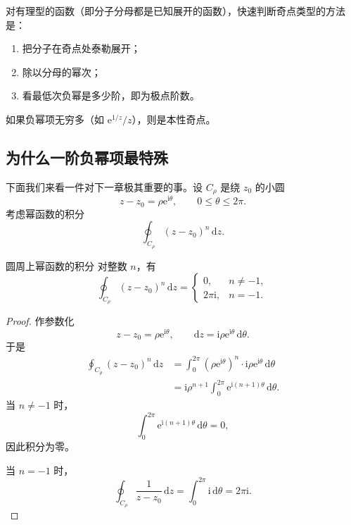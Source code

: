 \begin{tishi}
对有理型的函数（即分子分母都是已知展开的函数），快速判断奇点类型的方法是：
\begin{enumerate}
    \item 把分子在奇点处泰勒展开；
    \item 除以分母的幂次；
    \item 看最低次负幂是多少阶，即为极点阶数。
\end{enumerate}
如果负幂项无穷多（如 $\mathrm{e}^{1/z}/z$），则是本性奇点。
\end{tishi}

\subsection{为什么一阶负幂项最特殊}

下面我们来看一件对下一章极其重要的事。设 $C_\rho$ 是绕 $z_0$ 的小圆
\[
    z-z_0=\rho \mathrm{e}^{\mathrm{i}\theta},\qquad 0\le \theta\le 2\pi.
\]
考虑幂函数的积分
\[
    \oint_{C_\rho}(z-z_0)^n\,\mathrm{d}z.
\]

\begin{dingli}{圆周上幂函数的积分}{}
对整数 $n$，有
\[
    \oint_{C_\rho}(z-z_0)^n\,\mathrm{d}z
    =
    \begin{cases}
        0, & n\ne -1,\\[4pt]
        2\pi \mathrm{i}, & n=-1.
    \end{cases}
\]
\end{dingli}

\begin{proof}
作参数化
\[
    z-z_0=\rho \mathrm{e}^{\mathrm{i}\theta},\qquad
    \mathrm{d}z=\mathrm{i}\rho \mathrm{e}^{\mathrm{i}\theta}\,\mathrm{d}\theta.
\]
于是
\begin{align*}
    \oint_{C_\rho}(z-z_0)^n\,\mathrm{d}z
    &= \int_0^{2\pi}
    (\rho \mathrm{e}^{\mathrm{i}\theta})^n
    \cdot \mathrm{i}\rho \mathrm{e}^{\mathrm{i}\theta}\,\mathrm{d}\theta \\
    &= \mathrm{i}\rho^{n+1}
    \int_0^{2\pi}\mathrm{e}^{\mathrm{i}(n+1)\theta}\,\mathrm{d}\theta.
\end{align*}
当 $n\ne -1$ 时，
\[
    \int_0^{2\pi}\mathrm{e}^{\mathrm{i}(n+1)\theta}\,\mathrm{d}\theta=0,
\]
因此积分为零。

当 $n=-1$ 时，
\[
    \oint_{C_\rho}\frac{1}{z-z_0}\,\mathrm{d}z
    = \int_0^{2\pi}\mathrm{i}\,\mathrm{d}\theta
    = 2\pi \mathrm{i}.
\]
\end{proof}

